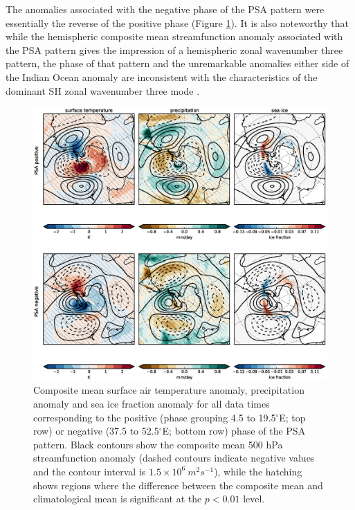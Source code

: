 The anomalies associated with the negative phase of the PSA pattern were essentially the reverse of the positive phase (Figure \ref{fig:surface_composites}). It is also noteworthy that while the hemispheric composite mean streamfunction anomaly associated with the PSA pattern gives the impression of a hemispheric zonal wavenumber three pattern, the phase of that pattern and the unremarkable anomalies either side of the Indian Ocean anomaly are inconsistent with the characteristics of the dominant SH zonal wavenumber three mode \citep[e.g.][]{Raphael2004,IrvingSimmonds2015}.

\begin{figure}
\begin{center}
\includegraphics[width=1\columnwidth]{figures/psa/psa-var-composites-phase-range_ERAInterim_500hPa-lat10S10Nmean-lon115E235Ezeropad_030day-runmean-anom-wrt-all_native-np20N260E.eps}
\caption[Composite mean surface air temperature anomaly, precipitation anomaly and sea ice fraction anomaly for all data times corresponding to the positive or negative phase of the PSA pattern]{\label{fig:surface_composites}
Composite mean surface air temperature anomaly, precipitation anomaly and sea ice fraction anomaly for all data times corresponding to the positive (phase grouping 4.5 to 19.5$^{\circ}$E; top row) or negative (37.5 to 52.5$^{\circ}$E; bottom row) phase of the PSA pattern. Black contours show the composite mean 500 hPa streamfunction anomaly (dashed contours indicate negative values and the contour interval is $1.5 \times 10^6 \: m^2 s^{-1}$), while the hatching shows regions where the difference between the composite mean and climatological mean is significant at the $p < 0.01$ level.%
}
\end{center}
\end{figure}


